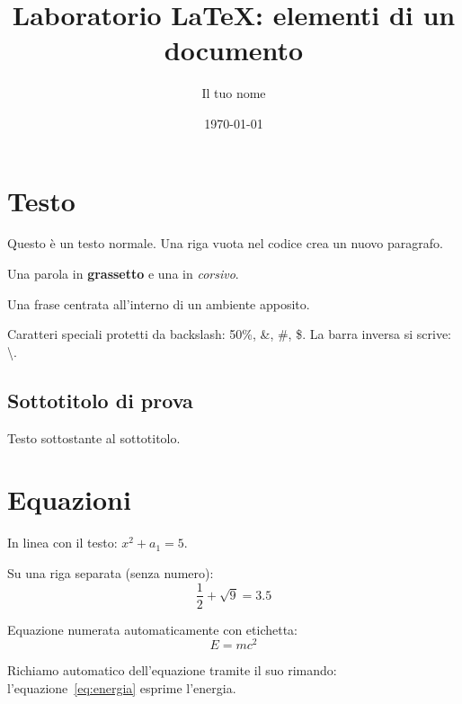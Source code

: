 \documentclass[a4paper,11pt]{article}
\title{Laboratorio LaTeX: elementi di un documento}
\author{Il tuo nome}
\date{\today}
\begin{document}
\maketitle
\tableofcontents
\clearpage

\section{Testo}\label{sec:testo}
Questo è un testo normale. Una riga vuota nel codice crea un nuovo paragrafo.

Una parola in \textbf{grassetto} e una in \textit{corsivo}.

\begin{center}
Una frase centrata all'interno di un ambiente apposito.
\end{center}

Caratteri speciali protetti da backslash: 50\%, \&, \#, \$. 
La barra inversa si scrive: \textbackslash{}.

\subsection{Sottotitolo di prova}
Testo sottostante al sottotitolo.



\section{Equazioni}
In linea con il testo: $x^{2} + a_{1} = 5$.

Su una riga separata (senza numero):
\[
  \frac{1}{2} + \sqrt{9} = 3.5
\]

Equazione numerata automaticamente con etichetta:
\begin{equation}
  E = m c^{2}
  \label{eq:energia}
\end{equation}

Richiamo automatico dell'equazione tramite il suo rimando: l'equazione~\eqref{eq:energia} esprime l'energia.

\end{document}
